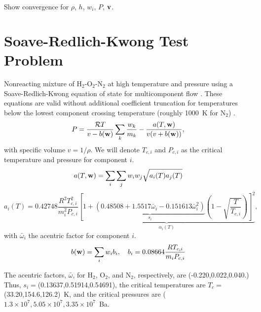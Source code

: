 \documentclass[final]{siamltex}
\def\vb {{\bf v}}
\def\wb {{\bf w}}
\begin{document}
Show convergence for $\rho$, $h$, $w_i$, $P$, $\vb$.

\section{Soave-Redlich-Kwong Test Problem}

Nonreacting mixture of H$_2$-O$_2$-N$_2$ at high temperature and pressure
using a Soave-Redlich-Kwong equation of state \cite{RedlichKwong,Soave}
for multicomponent flow \cite{GMD11}.  These equations are valid without
additional coefficient truncation for temperatures below the lowest component 
crossing temperature (roughly 1000~K for N$_2$) \cite{GMD11}.
\begin{equation}
P = \frac{\mathcal{R}T}{v-b(\wb)}\sum_k\frac{w_k}{m_k} - \frac{a(T,\wb)}{v(v+b(\wb))},
\end{equation}
with specific volume $v=1/\rho$.  We will denote $T_{c,i}$ and $P_{c,i}$ as the critical
temperature and pressure for component $i$.
\begin{equation}
a(T,\wb) = \sum_i\sum_j w_iw_j\sqrt{a_i(T)a_j(T)}
\end{equation}
\begin{equation}
a_i(T) = 0.42748\frac{R^2T_{c,i}^2}{m_i^2 P_{c,i}}\underbrace{\left[1 + \underbrace{\left(0.48508 + 1.5517\bar\omega_i - 0.151613\bar\omega_i^2\right)}_{s_i}\left(1-\sqrt{\frac{T}{T_{c,i}}}\right)\right]^2}_{\alpha_i(T)},
\end{equation}
with $\bar\omega_i$ the acentric factor for component $i$.
\begin{equation}
b(\wb) = \sum_i w_i b_i, \quad b_i = 0.08664\frac{RT_{c,i}}{m_i P_{c,i}}
\end{equation}

The acentric factors, $\bar\omega$, for H$_2$, O$_2$, and N$_2$, respectively, 
are (-0.220,0.022,0.040.)  Thus, $s_i=$(0.13637,0.51914,0.54691),
the critical temperatures are $T_{c}=$ (33.20,154.6,126.2)~K, 
and the critical pressures are ($1.3\times 10^7,5.05\times 10^7,3.35\times 10^7$~Ba.
\end{document}
